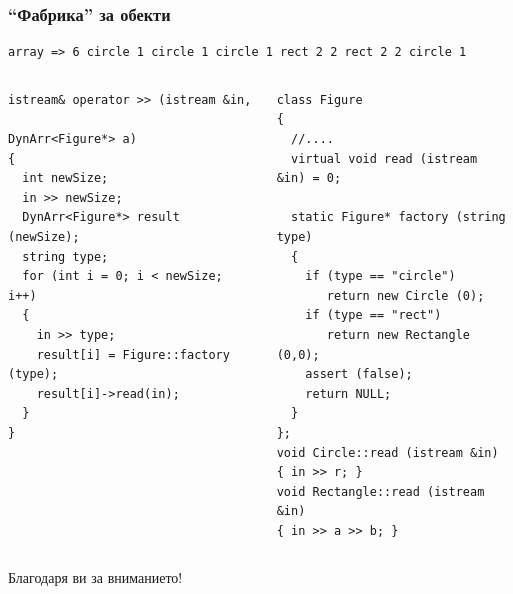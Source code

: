 \documentclass{beamer}
\begin{document}
\begin{frame}[fragile]
\frametitle{``Фабрика'' за обекти}



\begin{flushleft}
\begin{lstlisting}
array => 6 circle 1 circle 1 circle 1 rect 2 2 rect 2 2 circle 1 
\end{lstlisting}  
\end{flushleft}

\begin{columns}[t]
  \begin{column}{0.5\textwidth}
\begin{flushleft}
\begin{lstlisting}
istream& operator >> (istream &in, 
                      DynArr<Figure*> a)
{
  int newSize; 
  in >> newSize; 
  DynArr<Figure*> result (newSize);
  string type;
  for (int i = 0; i < newSize; i++)
  {
    in >> type;
    result[i] = Figure::factory (type); 
    result[i]->read(in);
  }
}
\end{lstlisting}  
\end{flushleft}
  \end{column}
  \begin{column}{0.5\textwidth}
\begin{flushleft}
\begin{lstlisting}
class Figure
{
  //....
  virtual void read (istream &in) = 0;
  
  static Figure* factory (string type)
  {
    if (type == "circle") 
       return new Circle (0);
    if (type == "rect") 
       return new Rectangle (0,0);
    assert (false);
    return NULL;
  }
};
void Circle::read (istream &in)
{ in >> r; }
void Rectangle::read (istream &in)
{ in >> a >> b; }
\end{lstlisting}  
\end{flushleft}

  \end{column}
\end{columns}


\end{frame}


\begin{frame}
\centerline{Благодаря ви за вниманието!}
\end{frame}
\end{document}
